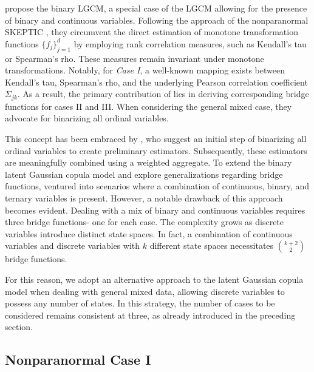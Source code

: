 
\citet{Fan17} propose the binary LGCM, a special case of the LGCM allowing for the presence of binary and continuous variables. Following the approach of the nonparanormal SKEPTIC \citep{Liu12}, they circumvent the direct estimation of monotone transformation functions $\{f_j\}_{j=1}^d$ by employing rank correlation measures, such as Kendall's tau or Spearman's rho. These measures remain invariant under monotone transformations. Notably, for \textit{Case I}, a well-known mapping exists between Kendall's tau, Spearman's rho, and the underlying Pearson correlation coefficient $\Sigma_{jk}$. As a result, the primary contribution of \citet{Fan17} lies in deriving corresponding bridge functions for cases II and III. When considering the general mixed case, they advocate for binarizing all ordinal variables.

This concept has been embraced by \citet{Feng19}, who suggest an initial step of binarizing all ordinal variables to create preliminary estimators. Subsequently, these estimators are meaningfully combined using a weighted aggregate. To extend the binary latent Gaussian copula model and explore generalizations regarding bridge functions, \citet{Quan18} ventured into scenarios where a combination of continuous, binary, and ternary variables is present. However, a notable drawback of this approach becomes evident. Dealing with a mix of binary and continuous variables requires three bridge functions- one for each case. The complexity grows as discrete variables introduce distinct state spaces. In fact, a combination of continuous variables and discrete variables with $k$ different state spaces necessitates $\binom{k+2}{2}$ bridge functions.

For this reason, we adopt an alternative approach to the latent Gaussian copula model when dealing with general mixed data, allowing discrete variables to possess any number of states. In this strategy, the number of cases to be considered remains consistent at three, as already introduced in the preceding section.

\subsection{Nonparanormal Case I}\label{sec::nonparanormal_case1}

